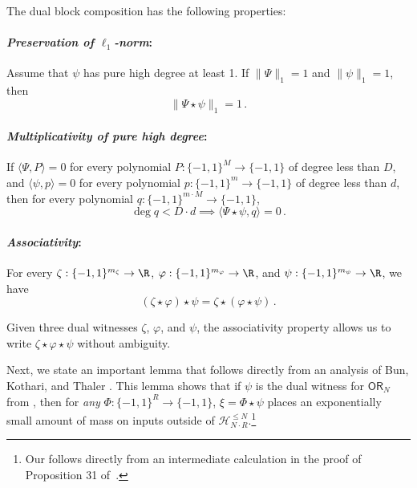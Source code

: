 \documentclass{toc}
\newcommand{\OR}{\mathsf{ OR}}
\newcommand{\bits}{\{-1,1\}}
\newcommand{\ls}{\star}
\begin{document}
\begin{proposition} \label{prop:ls}
	\label{prop12}
	The dual block composition %
has  %
the following properties:
	\paragraph{\emph{Preservation of $\ell_1$-norm}:} Assume that $\psi$ has pure high degree at least 1.
	If $\|\Psi\|_1 = 1$ and $\|\psi\|_1 = 1$, then
	\begin{equation}\|\Psi \ls \psi\|_1 = 1\,. \label{eqn:ls-norm}\end{equation}
	
	\paragraph{\emph{Multiplicativity of pure high degree}:} If $\langle \Psi, P \rangle = 0$ for every polynomial $P \colon \bits^M \to \bits$ of degree less than  $D$, and $\langle \psi, p \rangle = 0$ for every polynomial $p \colon \bits^m \to \bits$ of degree less than $d$, then
	for every polynomial $q \colon \bits^{m \cdot M} \to \bits$,
	\begin{equation}\deg q < D \cdot d \implies \langle \Psi \ls \psi, q \rangle = 0\,. \label{eqn:ls-phd} \end{equation}
	
	\paragraph{\emph{Associativity}:} For every $\zeta: \bits^{m_\zeta} \to \R$, $\varphi: \bits^{m_\varphi} \to \R$, and $\psi: \bits^{m_\psi} \to \R$, we have
	\begin{equation} (\zeta \ls \varphi) \ls \psi = \zeta \ls (\varphi \ls \psi)\,. \label{eqn:ls-assoc} \end{equation}
\end{proposition}

Given three dual witnesses $\zeta$, $\varphi$, and $\psi$, the associativity property allows us to write $\zeta \ls \varphi \ls \psi$ without ambiguity.

Next, we state an important lemma that follows directly from an analysis of Bun, Kothari, and Thaler \cite[Proof of Proposition 31]{bkt}.
This lemma shows that if $\psi$ is the dual witness for $\OR_N$
from , then for \emph{any} $\Phi \colon \bits^R \to \bits$, $\xi = \Phi \ls \psi$ places an exponentially small amount of mass on inputs outside of $\mathcal{H}^{\le N}_{N \cdot R}$.\footnote{Our  follows directly from an intermediate calculation in the proof of Proposition 31 of~\cite{bkt}.}
\end{document}
